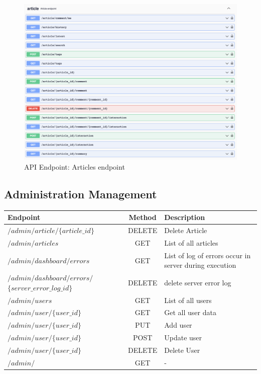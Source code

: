 \begin{figure}[!h]
    \centering
    \includegraphics[width=1\textwidth]{chapters/chapter_06/articles-operations}
    \caption{API Endpoint: Articles endpoint}
    \label{fig:api-articles-endpoint}
\end{figure}


\subsection{Administration Management}\label{subsec:admin-management}

\begin{tabularx}{\textwidth}{XcX}
  \toprule
  Endpoint & Method & Description \\
  \midrule
  $/admin/article/\{article\_id\}$ & DELETE & Delete Article \\
  $/admin/articles$ & GET & List of all articles \\
  $/admin/dashboard/errors$ & GET & List of log of errors occur in server during execution \\
  $/admin/dashboard/errors/$ $\{server\_error\_log\_id\}$ & DELETE & delete server error log \\
  $/admin/users$ & GET & List of all users \\
  $/admin/user/\{user\_id\}$ & GET & Get all user data \\
  $/admin/user/\{user\_id\}$ & PUT & Add user \\
  $/admin/user/\{user\_id\}$ & POST & Update user \\
  $/admin/user/\{user\_id\}$ & DELETE & Delete User \\
  $/admin/$ & GET & - \\
  \bottomrule
\end{tabularx}

